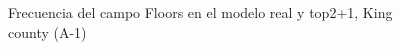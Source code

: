 \begin{figure}[H]
    \centering
    
    \caption{Frecuencia del campo Floors en el modelo real y top2+1, King county (A-1)}
    \label{frecuency-top2+1-floors}
\end{figure}